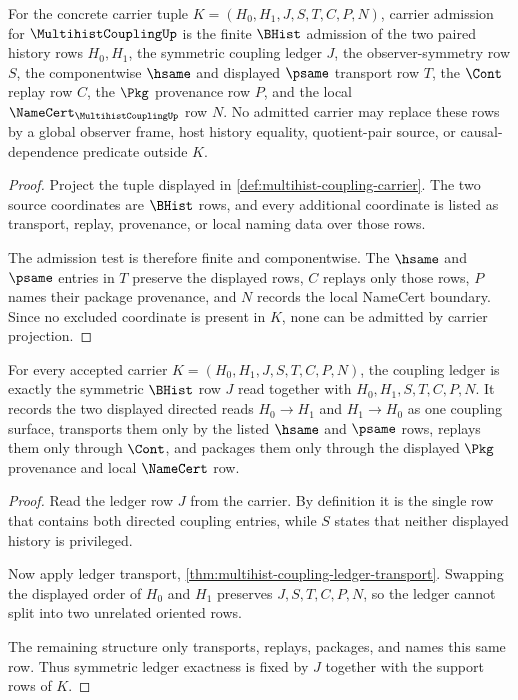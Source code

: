 \begin{theorem}
\label{thm:multihist-coupling-carrier-admission-obligation}
For the concrete carrier tuple $K=(H_0,H_1,J,S,T,C,P,N)$, carrier admission for $\MultihistCouplingUp$ is the finite $\BHist$ admission of the two paired history rows $H_0,H_1$, the symmetric coupling ledger $J$, the observer-symmetry row $S$, the componentwise $\hsame$ and displayed $\psame$ transport row $T$, the $\Cont$ replay row $C$, the $\Pkg$ provenance row $P$, and the local $\NameCert_{\MultihistCouplingUp}$ row $N$. No admitted carrier may replace these rows by a global observer frame, host history equality, quotient-pair source, or causal-dependence predicate outside $K$.
\end{theorem}
\begin{proof}
Project the tuple displayed in \autoref{def:multihist-coupling-carrier}. The two source coordinates are $\BHist$ rows, and every additional coordinate is listed as transport, replay, provenance, or local naming data over those rows.

The admission test is therefore finite and componentwise. The $\hsame$ and $\psame$ entries in $T$ preserve the displayed rows, $C$ replays only those rows, $P$ names their package provenance, and $N$ records the local NameCert boundary. Since no excluded coordinate is present in $K$, none can be admitted by carrier projection.
\end{proof}

\begin{theorem}
\label{thm:multihist-coupling-symmetric-ledger-exactness}
For every accepted carrier $K=(H_0,H_1,J,S,T,C,P,N)$, the coupling ledger is exactly the symmetric $\BHist$ row $J$ read together with $H_0,H_1,S,T,C,P,N$. It records the two displayed directed reads $H_0 \to H_1$ and $H_1 \to H_0$ as one coupling surface, transports them only by the listed $\hsame$ and $\psame$ rows, replays them only through $\Cont$, and packages them only through the displayed $\Pkg$ provenance and local $\NameCert$ row.
\end{theorem}
\begin{proof}
Read the ledger row $J$ from the carrier. By definition it is the single row that contains both directed coupling entries, while $S$ states that neither displayed history is privileged.

Now apply ledger transport, \autoref{thm:multihist-coupling-ledger-transport}. Swapping the displayed order of $H_0$ and $H_1$ preserves $J,S,T,C,P,N$, so the ledger cannot split into two unrelated oriented rows.

The remaining structure only transports, replays, packages, and names this same row. Thus symmetric ledger exactness is fixed by $J$ together with the support rows of $K$.
\end{proof}

